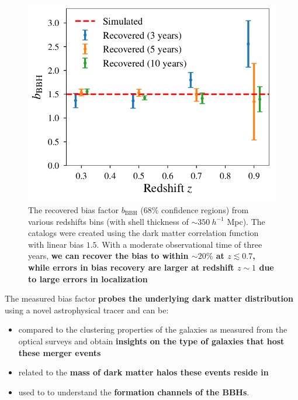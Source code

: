 \documentclass[a1,portrait]{a1poster}
\begin{document}
\begin{textblock}{7.3}
\begin{figure}[t]
	\centering
	\includegraphics[scale=0.73]{moneyplot.png}
	\caption{\small{The recovered bias factor $b_\mathrm{BBH}$ ({68\%} confidence regions) from various redshifts bins (with shell thickness of $\sim 350~h^{-1}$ Mpc). The catalogs were created using the dark matter correlation function with  linear bias $1.5$. With a moderate observational time of three years, \textbf{we can recover the bias to within $\sim 20\%$ at $z \lesssim 0.7$, while errors in bias recovery are larger at redshift $z \sim 1$ due to large errors in localization}}}
\end{figure}
The measured bias factor \textbf{probes the underlying dark matter distribution} using a novel astrophysical tracer and can be:
\begin{itemize}
	\item compared to the clustering properties of the galaxies as measured from the optical surveys  and obtain \textbf{insights on the type of galaxies that host these merger events}
	\item related to the \textbf{mass of dark matter halos these events reside in}
	\item used to to understand the \textbf{formation channels of the BBHs}.
\end{itemize}
\end{textblock}
\end{document}
